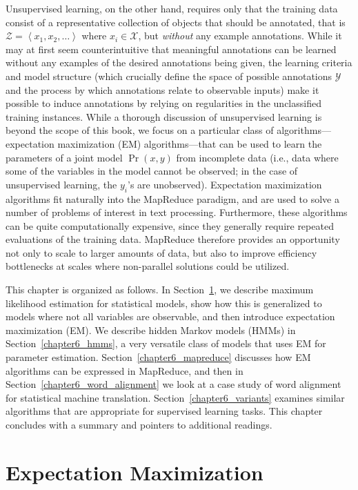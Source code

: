 Unsupervised learning, on the other hand, requires only that the
training data consist of a representative collection of objects that
should be annotated, that is $\mathcal{Z} = \left\langle x_1, x_2 ,
\ldots \right\rangle$ where $x_i \in \mathcal{X}$, but \emph{without}
any example annotations.  While it may at first seem counterintuitive
that meaningful annotations can be learned without any examples of the
desired annotations being given, the learning criteria and model
structure (which crucially define the space of possible annotations
$\mathcal{Y}$ and the process by which annotations relate to
observable inputs) make it possible to induce annotations by relying
on regularities in the unclassified training instances. While a
thorough discussion of unsupervised learning is beyond the scope of
this book, we focus on a particular class of algorithms---expectation
maximization (EM) algorithms---that can be used to learn the
parameters of a joint model $\Pr(x,y)$ from incomplete data (i.e.,
data where some of the variables in the model cannot be observed; in
the case of unsupervised learning, the $y_i$'s are unobserved).
Expectation maximization algorithms fit naturally into the MapReduce
paradigm, and are used to solve a number of problems of interest in
text processing.  Furthermore, these algorithms can be quite
computationally expensive, since they generally require repeated
evaluations of the training data.  MapReduce therefore provides an
opportunity not only to scale to larger amounts of data, but also to
improve efficiency bottlenecks at scales where non-parallel solutions
could be utilized.

This chapter is organized as follows.  In
Section~\ref{chapter6_intro}, we describe maximum likelihood
estimation for statistical models, show how this is generalized to
models where not all variables are observable, and then introduce
expectation maximization (EM).  We describe hidden Markov models
(HMMs) in Section~\ref{chapter6_hmms}, a very versatile class of
models that uses EM for parameter estimation.
Section~\ref{chapter6_mapreduce} discusses how EM algorithms can be
expressed in MapReduce, and then in
Section~\ref{chapter6_word_alignment} we look at a case study of word
alignment for statistical machine translation.
Section~\ref{chapter6_variants} examines similar algorithms that are
appropriate for supervised learning tasks.  This chapter concludes
with a summary and pointers to additional readings.

\section{Expectation Maximization}
\label{chapter6_intro}

